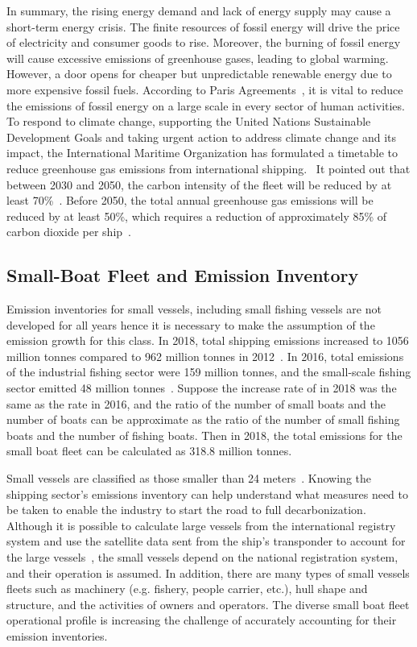 \newpage
In summary, the rising energy demand and lack of energy supply may cause a short-term energy crisis. The finite resources of fossil energy will drive the price of electricity and consumer goods to rise. Moreover, the burning of fossil energy will cause excessive emissions of greenhouse gases, leading to global warming. However, a door opens for cheaper but unpredictable renewable energy due to more expensive fossil fuels. According to Paris Agreements~\cite{unies2015accord}, it is vital to reduce the emissions of fossil energy on a large scale in every sector of human activities. To respond to climate change, supporting the United Nations Sustainable Development Goals and taking urgent action to address climate change and its impact, the International Maritime Organization has formulated a timetable to reduce greenhouse gas emissions from international shipping.~\cite{joung2020imo} It pointed out that between 2030 and 2050, the carbon intensity of the fleet will be reduced by at least 70\%~\cite{joung2020imo}. Before 2050, the total annual greenhouse gas emissions will be reduced by at least 50\%, which requires a reduction of approximately 85\% of carbon dioxide per ship~\cite{joung2020imo}. 

\subsection{Small-Boat Fleet and Emission Inventory}
Emission inventories for small vessels, including small fishing vessels are not developed for all years hence it is necessary to make the assumption of the emission growth for this class. In 2018, total shipping  emissions increased to 1056 million tonnes compared to 962 million tonnes in 2012~\cite{IMO2021Fourth}.
In 2016, total  emissions of the industrial fishing sector were 159 million tonnes, and the small-scale fishing sector emitted 48 million tonnes~\cite{GREER2019103382}. Suppose the increase rate of  in 2018 was the same as the rate in 2016, and the ratio of the number of small boats and the number of boats can be approximate as the ratio of the number of small fishing boats and the number of fishing boats. Then in 2018, the total  emissions for the small boat fleet can be calculated as 318.8 million tonnes.

Small vessels are classified as those smaller than 24 meters~\cite{uk2021Operational}. Knowing the shipping sector's emissions inventory can help understand what measures need to be taken to enable the industry to start the road to full decarbonization. Although it is possible to calculate large vessels from the international registry system and use the satellite data sent from the ship's transponder to account for the large vessels~\cite{IMO2021Fourth}, the small vessels depend on the national registration system, and their operation is assumed. In addition, there are many types of small vessels fleets such as machinery (e.g. fishery, people carrier, etc.), hull shape and structure, and the activities of owners and operators. The diverse small boat fleet operational profile is increasing the challenge of accurately accounting for their emission inventories.

